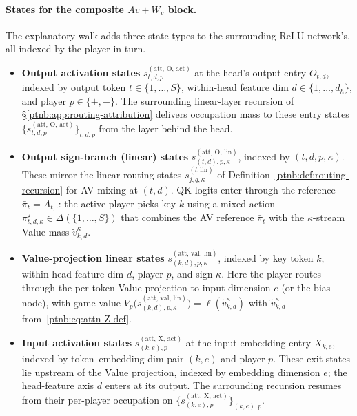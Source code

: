 \paragraph{States for the composite $Av{+}W_v$ block.} The explanatory walk adds three state types to the surrounding ReLU-network's,
all indexed by the player in turn.
\begin{itemize}
    \item \textbf{Output activation states} $s_{t,d,p}^{(\mathrm{att},\,\mathrm{O},\,\mathrm{act})}$ at the
        head's output entry $O_{t,d}$, indexed by output token $t \in \{1,\dots,S\}$, within-head feature
        dim $d \in \{1,\dots,d_h\}$, and player $p \in \{+,-\}$. The surrounding linear-layer recursion of \S\ref{ptnb:app:routing-attribution}
        delivers occupation mass to these entry states $\{s_{t,d,p}^{(\mathrm{att},\,\mathrm{O},\,\mathrm{act})}\}_{t,d,p}$
        from the layer behind the head.
    \item \textbf{Output sign-branch (linear) states}
        $s_{(t,d),p,\kappa}^{(\mathrm{att},\,\mathrm{O},\,\mathrm{lin})}$, indexed by $(t, d, p, \kappa)$.
        These mirror the linear routing states $s_{j,q,\kappa}^{(l,\mathrm{lin})}$ of
        Definition~\ref{ptnb:def:routing-recursion} for AV mixing at $(t, d)$.
        QK logits enter through the reference $\bar\pi_t = A_{t,\cdot}$: the active
        player picks key $k$ using a mixed action $\pi_{t,d,\kappa}^\star \in \Delta(\{1,\dots,S\})$
        that combines the AV reference $\bar\pi_t$ with the $\kappa$-stream Value mass
        $\tilde{v}_{k,d}^\kappa$.
    \item \textbf{Value-projection linear states}
        $s_{(k,d),p,\kappa}^{(\mathrm{att},\,\mathrm{val},\,\mathrm{lin})}$, indexed by key token $k$,
        within-head feature dim $d$, player $p$, and sign $\kappa$. Here the player routes through the per-token Value projection to input dimension $e$
        (or the bias node), with game value
        $V_p\!\bigl(s_{(k,d),p,\kappa}^{(\mathrm{att},\,\mathrm{val},\,\mathrm{lin})}\bigr) =
            \ell(\tilde{v}_{k,d}^\kappa)$ with $\tilde{v}_{k,d}^\kappa$ from~\eqref{ptnb:eq:attn-Z-def}.
    \item \textbf{Input activation states} $s_{(k,e),p}^{(\mathrm{att},\,\mathrm{X},\,\mathrm{act})}$ at the
        input embedding entry $X_{k,e}$, indexed by token--embedding-dim pair $(k,e)$ and player $p$. These exit states lie upstream of the Value projection, indexed by embedding dimension $e$;
        the head-feature axis $d$ enters at its output. The surrounding recursion resumes from
        their per-player occupation on $\{s_{(k,e),p}^{(\mathrm{att},\,\mathrm{X},\,\mathrm{act})}\}_{(k,e),p}$.
\end{itemize}

